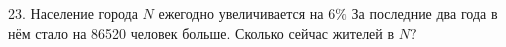 23. Население города $N$ ежегодно увеличивается на $6\%$ За последние два года в нём стало на 86520 человек больше. Сколько сейчас жителей в $N?$\\
